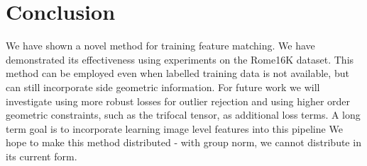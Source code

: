 \documentclass[10pt,twocolumn,letterpaper]{article}
\begin{document}
\section{Conclusion}

We have shown a novel method for training feature matching.
We have demonstrated its effectiveness using experiments on the Rome16K dataset.
This method can be employed even when labelled training data is not available, but can still incorporate side geometric information.
For future work we will investigate using more robust losses for outlier rejection and using higher order geometric constraints, such as the trifocal tensor, as additional loss terms.
A long term goal is to incorporate learning image level features into this pipeline
We hope to make this method distributed - with group norm, we cannot distribute in its current form.

{\small


}
\end{document}

